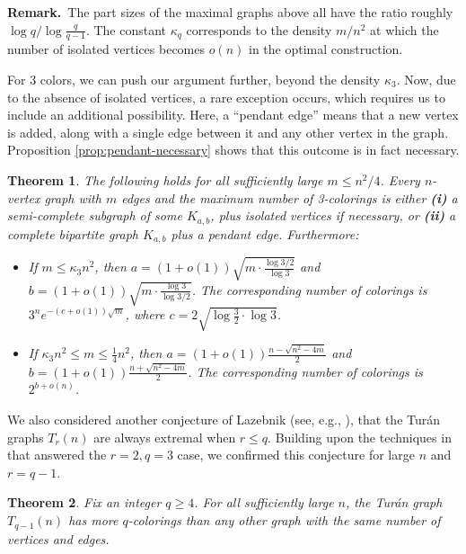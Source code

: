 \documentclass[11pt]{article}
\newtheorem{theorem}{Theorem}[section]
\begin{document}
\noindent \textbf{Remark.}\, The part sizes of the maximal graphs
above all have the ratio roughly $\log q / \log \frac{q}{q-1}$.  The
constant $\kappa_q$ corresponds to the density $m/n^2$ at which the
number of isolated vertices becomes $o(n)$ in the optimal
construction.

\vspace{3mm}

For 3 colors, we can push our argument further, beyond the density
$\kappa_3$.  Now, due to the absence of isolated vertices, a rare
exception occurs, which requires us to include an additional
possibility.  Here, a ``pendant edge'' means that a new vertex is
added, along with a single edge between it and any other vertex in the
graph.  Proposition \ref{prop:pendant-necessary} shows that this
outcome is in fact necessary.

\begin{theorem}
  \label{thm:main:q=3}
  The following holds for all sufficiently large $m \leq n^2/4$.
  Every $n$-vertex graph with $m$ edges and the maximum number of
  3-colorings is either \textbf{(i)} a semi-complete subgraph of some
  $K_{a,b}$, plus isolated vertices if necessary, or \textbf{(ii)} a
  complete bipartite graph $K_{a,b}$ plus a pendant edge.
  Furthermore:
  \begin{itemize}
  \item If $m \leq \kappa_3 n^2$, then $a = (1+o(1))\sqrt{m \cdot
      \frac{\log 3/2}{\log 3}}$ and $b = (1+o(1))\sqrt{m \cdot
      \frac{\log 3}{\log 3/2}}$.  The corresponding number of
    colorings is $3^n e^{-(c+o(1))\sqrt{m}}$, where $c = 2\sqrt{ \log
      \frac{3}{2} \cdot \log 3 }$.
  \item If $\kappa_3 n^2 \leq m \leq \frac{1}{4} n^2$, then $a =
    (1+o(1))\frac{n-\sqrt{n^2-4m}}{2}$ and $b =
    (1+o(1))\frac{n+\sqrt{n^2-4m}}{2}$.  The corresponding number of
    colorings is $2^{b + o(n)}$.
  \end{itemize}
\end{theorem}


We also considered another conjecture of Lazebnik (see, e.g.,
\cite{LPW}), that the Tur\'an graphs $T_r(n)$ are always extremal
when $r \leq q$.  Building upon the techniques in \cite{LPW} that
answered the $r=2, q=3$ case, we confirmed this conjecture for large
$n$ and $r = q-1$.

\begin{theorem}
  \label{thm:exact:turan}
  Fix an integer $q \geq 4$.  For all sufficiently large $n$, the
  Tur\'an graph $T_{q-1}(n)$ has more $q$-colorings than any other
  graph with the same number of vertices and edges.
\end{theorem}
\end{document}
